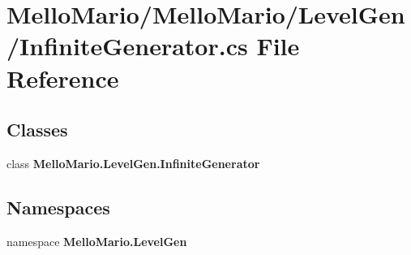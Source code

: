 \section{Mello\+Mario/\+Mello\+Mario/\+Level\+Gen/\+Infinite\+Generator.cs File Reference}
\label{InfiniteGenerator_8cs}
\subsection*{Classes}
\begin{DoxyCompactItemize}
\item 
class \textbf{ Mello\+Mario.\+Level\+Gen.\+Infinite\+Generator}
\end{DoxyCompactItemize}
\subsection*{Namespaces}
\begin{DoxyCompactItemize}
\item 
namespace \textbf{ Mello\+Mario.\+Level\+Gen}
\end{DoxyCompactItemize}
